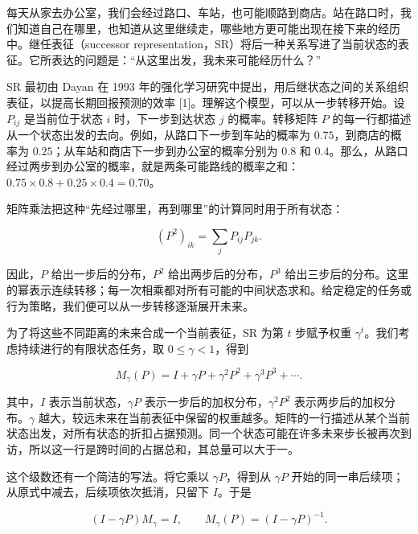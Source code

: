 \documentclass[11pt,a4paper]{article}
\begin{document}
每天从家去办公室，我们会经过路口、车站，也可能顺路到商店。站在路口时，我们知道自己在哪里，也知道从这里继续走，哪些地方更可能出现在接下来的经历中。继任表征（successor
representation，SR）将后一种关系写进了当前状态的表征。它所表达的问题是：“从这里出发，我未来可能经历什么？”

SR 最初由 Dayan 在 1993
年的强化学习研究中提出，用后继状态之间的关系组织表征，以提高长期回报预测的效率
{[}1{]}。理解这个模型，可以从一步转移开始。设 \(P_{ij}\) 是当前位于状态
\(i\) 时，下一步到达状态 \(j\) 的概率。转移矩阵 \(P\)
的每一行都描述从一个状态出发的去向。例如，从路口下一步到车站的概率为
\(0.75\)，到商店的概率为
\(0.25\)；从车站和商店下一步到办公室的概率分别为 \(0.8\) 和
\(0.4\)。那么，从路口经过两步到办公室的概率，就是两条可能路线的概率之和：\(0.75\times0.8+0.25\times0.4=0.70\)。

\par
\noindent\begin{minipage}{\linewidth}

矩阵乘法把这种“先经过哪里，再到哪里”的计算同时用于所有状态：

\[
(P^2)_{ik}=\sum_jP_{ij}P_{jk}.
\]

\end{minipage}\par

因此，\(P\) 给出一步后的分布，\(P^2\) 给出两步后的分布，\(P^3\)
给出三步后的分布。这里的幂表示连续转移；每一次相乘都对所有可能的中间状态求和。给定稳定的任务或行为策略，我们便可以从一步转移逐渐展开未来。

\par
\noindent\begin{minipage}{\linewidth}

为了将这些不同距离的未来合成一个当前表征，SR 为第 \(t\) 步赋予权重
\(\gamma^t\)。我们考虑持续进行的有限状态任务，取 \(0\leq\gamma<1\)，得到

\[
M_\gamma(P)=I+\gamma P+\gamma^2P^2+\gamma^3P^3+\cdots.
\]

\end{minipage}\par

其中，\(I\) 表示当前状态，\(\gamma P\)
表示一步后的加权分布，\(\gamma^2P^2\) 表示两步后的加权分布。\(\gamma\)
越大，较远未来在当前表征中保留的权重越多。矩阵的一行描述从某个当前状态出发，对所有状态的折扣占据预测。同一个状态可能在许多未来步长被再次到访，所以这一行是跨时间的占据总和，其总量可以大于一。

\par
\noindent\begin{minipage}{\linewidth}

这个级数还有一个简洁的写法。将它乘以 \(\gamma P\)，得到从 \(\gamma P\)
开始的同一串后续项；从原式中减去，后续项依次抵消，只留下 \(I\)。于是

\[
(I-\gamma P)M_\gamma=I,
\qquad
M_\gamma(P)=(I-\gamma P)^{-1}.
\]

\end{minipage}\par
\end{document}
